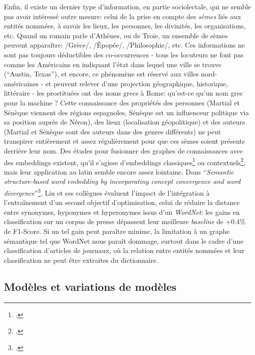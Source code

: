 Enfin, il existe un dernier type d'information, en partie sociolectale, qui ne semble pas avoir intéressé outre mesure: celui de la prise en compte des \textit{sèmes} liés aux entités nommées, à savoir les lieux, les personnes, les divinités, les organisations, etc. Quand un romain parle d'Athènes, ou de Troie, un ensemble de sèmes peuvent apparaître: /Grèce/, /Épopée/, /Philosophie/, etc. Ces informations ne sont pas toujours déductibles des co-occurrences - tous les locuteurs ne font pas comme les Américains en indiquant l'état dans lequel une ville se trouve (\enquote{Austin, Texas}), et encore, ce phénomène est réservé aux villes nord-américaines - et peuvent relever d'une projection géographique, historique, littéraire - les prostituées ont des noms grecs à Rome: qu'est-ce qu'un nom grec pour la machine ? Cette connaissance des propriétés des personnes (Martial et Sénèque viennent des régions espagnoles, Sénèque est un influenceur politique via sa position auprès de Néron), des lieux (localisation géopolitique) et des auteurs (Martial et Sénèque sont des auteurs dans des genres différents) ne peut transpirer entièrement et assez régulièrement pour que ces sèmes soient présents derrière leur nom. Des études pour fusionner des graphes de connaissances avec des embeddings existent, qu'il s'agisse d'embeddings classiques\footcite{wang_knowledge_2014} ou contextuels\footcite{zhang_ernie_2019}, mais leur application au latin semble encore assez lointaine. Dans \enquote{\textit{Semantic structure-based word embedding by incorporating concept convergence and word divergence}}\footcite{liu_semantic_2018}, Liu et ses collègues évaluent l'impact de l'intégration à l'entraînement d'un second objectif d'optimisation, celui de réduire la distance entre synonymes, hyponymes et hyperonymes issus d'un \textit{WordNet}: les gains en classification sur un corpus de presse dépassent leur meilleure \textit{baseline} de +0.4\% de F1-Score. Si un tel gain peut paraître minime, la limitation à un graphe sémantique tel que WordNet nous paraît dommage, surtout dans le cadre d'une classification d'articles de journaux, où la relation entre entités nommées et leur classification ne peut être extraites du dictionnaire.


\subsection{Modèles et variations de modèles}

